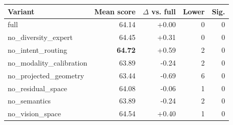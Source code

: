 \begin{tabular}{lrrrr}
\toprule
Variant & Mean score & $\Delta$ vs. full & Lower & Sig. \\
\midrule
full & 64.14 & +0.00 & 0 & 0 \\
no\_diversity\_expert & 64.45 & +0.31 & 0 & 0 \\
no\_intent\_routing & \textbf{64.72} & +0.59 & 2 & 0 \\
no\_modality\_calibration & 63.89 & -0.24 & 2 & 0 \\
no\_projected\_geometry & 63.44 & -0.69 & 6 & 0 \\
no\_residual\_space & 64.08 & -0.06 & 1 & 0 \\
no\_semantics & 63.89 & -0.24 & 2 & 0 \\
no\_vision\_space & 64.54 & +0.40 & 1 & 0 \\
\bottomrule
\end{tabular}
